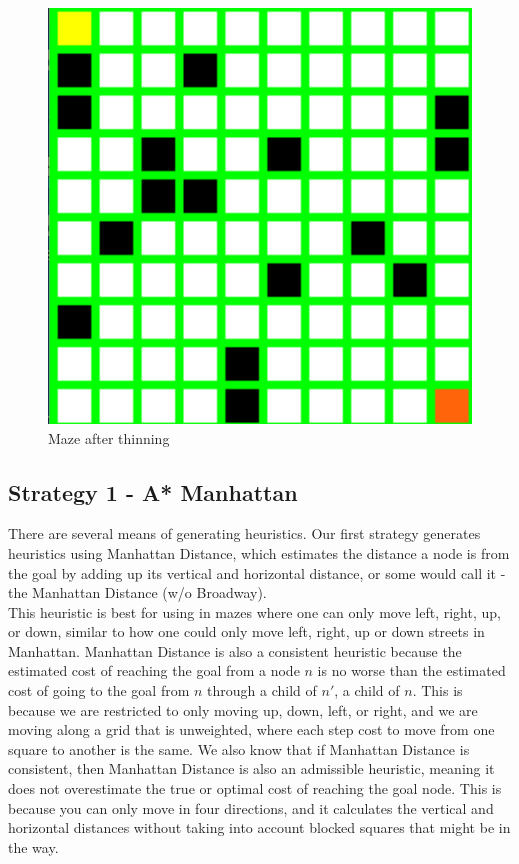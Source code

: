 \documentclass[11pt]{scrartcl} %
\begin{document}
 \begin{figure}[H]
 	\centering
  	\includegraphics*[scale=0.3]{MazeThinned.png}
	\caption{Maze after thinning}
	\label{fig:example}
 \end{figure}
\subsection{Strategy 1 - A* Manhattan}

There are several means of generating heuristics. Our first strategy generates heuristics using Manhattan Distance, which estimates the distance a node is from the goal by adding up its vertical and horizontal distance, or some would call it - the Manhattan Distance (w/o Broadway).\vspace{2em}\\
This heuristic is best for using in mazes where one can only move left, right, up, or down, similar to how one could only move left, right, up or down streets in Manhattan. Manhattan Distance is also a consistent heuristic because the estimated cost of reaching the goal from a node $n$ is no worse than the estimated cost of going to the goal from $n$ through a child of $n'$, a child of $n$. This is because we are restricted to only moving up, down, left, or right, and we are moving along a grid that is unweighted, where each step cost to move from one square to another is the same. We also know that if Manhattan Distance is consistent, then Manhattan Distance is also an admissible heuristic, meaning it does not overestimate the true or optimal cost of reaching the goal node. This is because you can only move in four directions, and it calculates the vertical and horizontal distances without taking into account blocked squares that might be in the way. 
\end{document}
